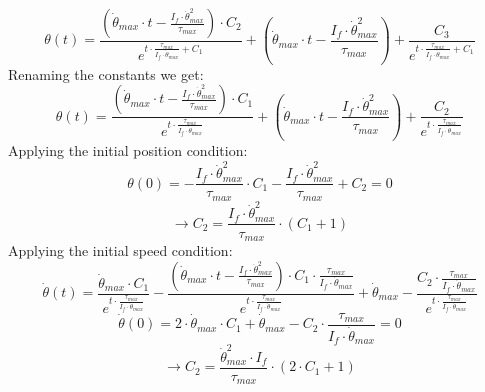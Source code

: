     \begin{equation*}
        \theta(t) = \frac{(\dot{\theta}_{max} \cdot t- \frac{I_f \cdot \dot{\theta}_{max}^2}{\tau_{max}})\cdot C_2 }
        {e^{t\cdot \frac{\tau_{max}}{I_f \cdot \dot{\theta}_{max}}+C_1}} 
        + (\dot{\theta}_{max} \cdot t- \frac{I_f \cdot \dot{\theta}_{max}^2}{\tau_{max}})
        + \frac{C_3 }
        {e^{t\cdot \frac{\tau_{max}}{I_f \cdot \dot{\theta}_{max}}+C_1}}
    \end{equation*}
Renaming the constants we get:
    \begin{equation*}
        \theta(t) = \frac{(\dot{\theta}_{max} \cdot t- \frac{I_f \cdot \dot{\theta}_{max}^2}{\tau_{max}})\cdot C_1 }
        {e^{t\cdot \frac{\tau_{max}}{I_f \cdot \dot{\theta}_{max}}}} 
        + (\dot{\theta}_{max} \cdot t- \frac{I_f \cdot \dot{\theta}_{max}^2}{\tau_{max}})
        + \frac{C_2 }
        {e^{t\cdot \frac{\tau_{max}}{I_f \cdot \dot{\theta}_{max}}}}
    \end{equation*}
    Applying the initial position condition:
    \begin{equation*}
        \theta(0) = -\frac{I_f \cdot \dot{\theta}_{max}^2}{\tau_{max}}\cdot C_1 
        - \frac{I_f \cdot \dot{\theta}_{max}^2}{\tau_{max}}
        + C_2 = 0
    \end{equation*}
    \begin{equation*}
        \rightarrow
        C_2 = 
        \frac{I_f \cdot \dot{\theta}_{max}^2}{\tau_{max}}\cdot (C_1+1)
    \end{equation*}
    Applying the initial speed condition:
    \begin{equation*}
        \dot{\theta}(t) = \frac{\dot{\theta}_{max}\cdot C_1 }
        {e^{t\cdot \frac{\tau_{max}}{I_f \cdot \dot{\theta}_{max}}}} 
        -\frac{(\dot{\theta}_{max} \cdot t- \frac{I_f \cdot \dot{\theta}_{max}^2}{\tau_{max}})\cdot C_1 \cdot \frac{\tau_{max}}{I_f \cdot \dot{\theta}_{max}} }
        {e^{t\cdot \frac{\tau_{max}}{I_f \cdot \dot{\theta}_{max}}}} 
        + \dot{\theta}_{max}
        - \frac{C_2\cdot \frac{\tau_{max}}{I_f \cdot \dot{\theta}_{max}} }
        {e^{t\cdot \frac{\tau_{max}}{I_f \cdot \dot{\theta}_{max}}}}
    \end{equation*}    
    \begin{equation*}
        \dot{\theta}(0) = 2\cdot \dot{\theta}_{max}\cdot C_1
        + \dot{\theta}_{max}
        - C_2\cdot \frac{\tau_{max}}{I_f \cdot \dot{\theta}_{max}}
        = 0
    \end{equation*}
    \begin{equation*}
        \rightarrow 
        C_2
        =
        \frac{\dot{\theta}^2_{max}\cdot I_f}{\tau_{max}} \cdot (2\cdot C_1
        + 1)
    \end{equation*}
